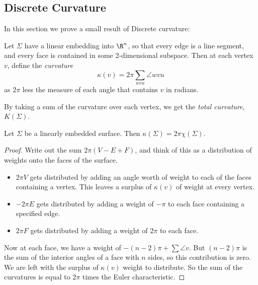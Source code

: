 \subsection{Discrete Curvature}

In this section we prove a small result of Discrete curvature:
\begin{definition}
Let $\Sigma$ have a linear embedding into $\R^n$, so that every edge is a line segment, and every face is contained in some 2-dimensional subspace. Then at each vertex $v$, define the \emph{curvature} 
\[\kappa(v)=2\pi \sum_{wvu} \angle wvu\]
as $2\pi$ less the measure of each angle that contains $v$ in radians. 
\end{definition}
By taking a sum of the curvature over each vertex, we get the \emph{total curvature}, $K(\Sigma)$.\\

\begin{theorem}
Let $\Sigma$ be a linearly embedded surface. Then $\kappa(\Sigma)=2\pi\chi(\Sigma)$.
\end{theorem}
\begin{proof}
Write out the sum $2\pi(V-E+F)$, and think of this as a distribution of weights onto the faces of the surface.
\begin{itemize}
\item $2\pi V$ gets distributed by adding an angle worth of weight to each of the faces containing a vertex. This leaves a surplus of $\kappa(v)$ of weight at every vertex.
\item $-2\pi E$ gets distributed by adding a weight of $-\pi$ to each face containing a specified edge.
\item $2\pi F$ gets distributed by adding a weight of $2\pi$ to each face.
\end{itemize}
Now at each face, we have a weight of $-(n-2)\pi+\sum \angle v$. But $(n-2)\pi$ is the sum of the interior angles of a face with $n$ sides, so this contribution is zero. We are left with the surplus of $\kappa(v)$ weight to distribute. So the sum of the curvatures is equal to $2\pi$ times the Euler characteristic. 
\end{proof}
